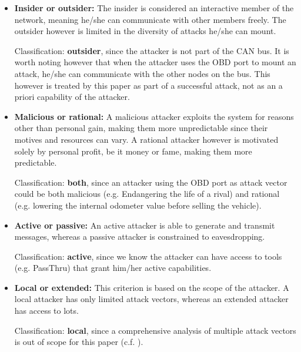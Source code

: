 \documentclass[11pt]{article}
\begin{document}
\begin{itemize}
	\item \textbf{Insider or outsider:} The insider is considered an interactive member of the network, meaning he/she can communicate with other members freely. The outsider however is limited in the diversity of attacks he/she can mount.
	
	Classification: \textbf{outsider}, since the attacker is not part of the CAN bus. It is worth noting however that when the attacker uses the OBD port to mount an attack, he/she can communicate with the other nodes on the bus. This however is treated by this paper as part of a successful attack, not as an a priori capability of the attacker.
	
	\item \textbf{Malicious or rational:}  A malicious attacker exploits the system for reasons other than personal gain, making them more unpredictable since their motives and resources can vary. A rational attacker however is motivated solely by personal profit, be it money or fame, making them more predictable.
	
	Classification: \textbf{both}, since an attacker using the OBD port as attack vector could be both malicious (e.g. Endangering the life of a rival) and rational (e.g. lowering the internal odometer value before selling the vehicle).
	
	\item \textbf{Active or passive:} An active attacker is able to generate and transmit messages, whereas a passive attacker is constrained to eavesdropping.
	
	Classification: \textbf{active}, since we know the attacker can have access to tools (e.g. PassThru) that grant him/her active capabilities.
	
	\item \textbf{Local or extended:} This criterion is based on the scope of the attacker. A local attacker has only limited attack vectors, whereas an extended attacker has access to lots.
	
	Classification: \textbf{local}, since a comprehensive analysis of multiple attack vectors is out of scope for this paper (c.f. \cite{Pike15}\cite{Kleberger15}\cite{Russel17}\cite{MillerA}\cite{Petit}\cite{Kosher}\cite{Kosher2}\cite{Bayer15}).
\end{itemize}
\end{document}
